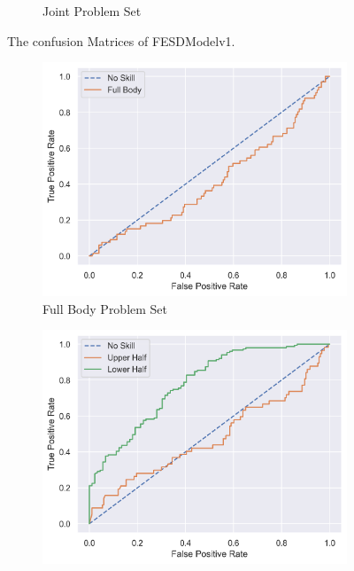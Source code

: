 \begin{figure}[!htbp]
\begin{subfigure}[b]{0.4\linewidth}
      \caption[]{Joint Problem Set}
      \label{fig:jt_conf_v1}
  \end{subfigure}
  \caption[Confusion Matrices of FESDModelv1]{The confusion Matrices of FESDModelv1.}
  \label{fig:conf_v1}
\end{figure}

\begin{figure}
  \centering
  \begin{subfigure}[b]{0.4\linewidth}
      \centering
      \includegraphics[width=\textwidth]{figures/Results/v1/roc/fb.png}
      \caption[]{Full Body Problem Set}
      \label{fig:fb_roc_v1}
  \end{subfigure}
  \hfill
  \begin{subfigure}[b]{0.4\linewidth}
      \centering
      \includegraphics[width=\textwidth]{figures/Results/v1/roc/hb.png}

\end{subfigure}
\end{figure}
